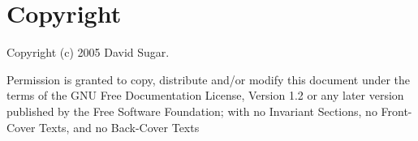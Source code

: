 \documentclass[a4paper,12pt]{article}
\begin{document}
\section{Copyright}
Copyright (c) 2005 David Sugar.

Permission is granted to copy, distribute and/or modify this document    
under the terms of the GNU Free Documentation License, Version 1.2 or any 
later version published by the Free Software Foundation;
with no Invariant Sections, no Front-Cover Texts, and no Back-Cover Texts
\end{document}
